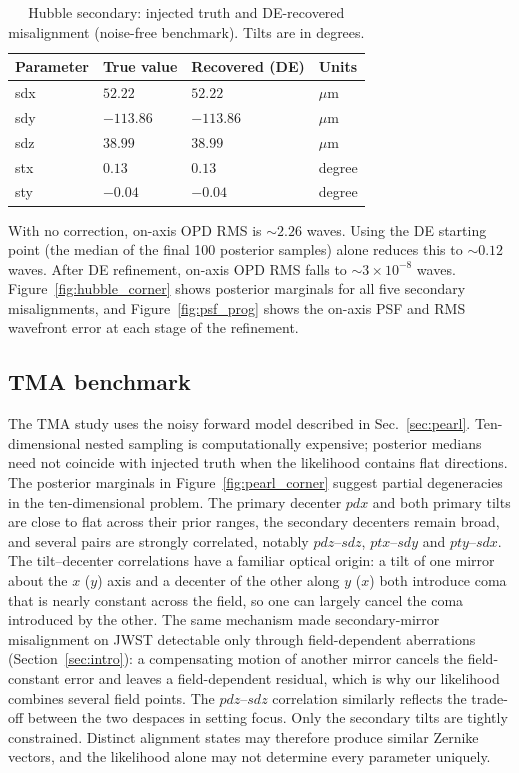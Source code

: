 \documentclass[fleqn,usenatbib]{rasti}
\begin{document}
\begin{table}
\centering
\caption{Hubble secondary: injected truth and DE-recovered misalignment (noise-free benchmark). Tilts are in degrees.}
\label{tab:hubble}
\begin{tabular}{llll}
\hline
\textbf{Parameter} & \textbf{True value} & \textbf{Recovered (DE)} & \textbf{Units} \\
\hline
sdx & $52.22$  & $52.22$  & $\mu$m \\
sdy & $-113.86$ & $-113.86$ & $\mu$m \\
sdz & $38.99$  & $38.99$  & $\mu$m \\
stx & $0.13$   & $0.13$   & degree \\
sty & $-0.04$  & $-0.04$  & degree \\
\hline
\end{tabular}
\end{table}

With no correction, on-axis OPD RMS is $\sim 2.26$ waves. Using the DE starting point (the median of the final 100 posterior samples) alone reduces this to $\sim 0.12$ waves. After DE refinement, on-axis OPD RMS falls to $\sim 3\times 10^{-8}$ waves. Figure~\ref{fig:hubble_corner} shows posterior marginals for all five secondary misalignments, and Figure~\ref{fig:psf_prog} shows the on-axis PSF and RMS wavefront error at each stage of the refinement.

\subsection{TMA benchmark}

The TMA study uses the noisy forward model described in Sec.~\ref{sec:pearl}. Ten-dimensional nested sampling is computationally expensive; posterior medians need not coincide with injected truth when the likelihood contains flat directions. The posterior marginals in Figure~\ref{fig:pearl_corner} suggest partial degeneracies in the ten-dimensional problem. The primary decenter $pdx$ and both primary tilts are close to flat across their prior ranges, the secondary decenters remain broad, and several pairs are strongly correlated, notably $pdz$--$sdz$, $ptx$--$sdy$ and $pty$--$sdx$. The tilt--decenter correlations have a familiar optical origin: a tilt of one mirror about the $x$ ($y$) axis and a decenter of the other along $y$ ($x$) both introduce coma that is nearly constant across the field, so one can largely cancel the coma introduced by the other. The same mechanism made secondary-mirror misalignment on JWST detectable only through field-dependent aberrations (Section~\ref{sec:intro}): a compensating motion of another mirror cancels the field-constant error and leaves a field-dependent residual, which is why our likelihood combines several field points. The $pdz$--$sdz$ correlation similarly reflects the trade-off between the two despaces in setting focus. Only the secondary tilts are tightly constrained. Distinct alignment states may therefore produce similar Zernike vectors, and the likelihood alone may not determine every parameter uniquely.
\end{document}
